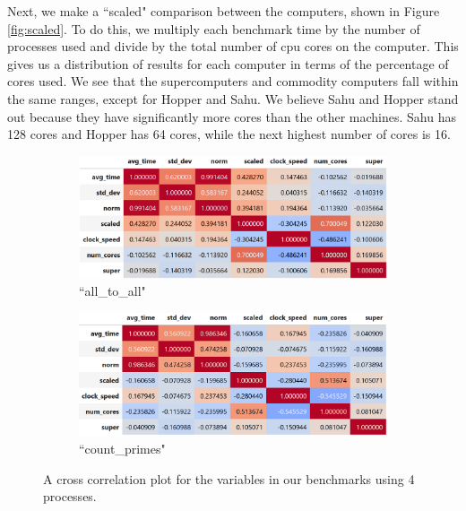 \documentclass{article}
\begin{document}
Next, we make a ``scaled" comparison between the computers, shown in Figure \ref{fig:scaled}. To do this, we multiply each benchmark time by the number of processes used and divide by the total number of cpu cores on the computer. This gives us a distribution of results for each computer in terms of the percentage of cores used. We see that the supercomputers and commodity computers fall within the same ranges, except for Hopper and Sahu. We believe Sahu and Hopper stand out because they have significantly more cores than the other machines. Sahu has 128 cores and Hopper has 64 cores, while the next highest number of cores is 16.


\begin{figure}[h]
    \centering
    \begin{subfigure}[b]{0.49\textwidth}
         \centering
         \includegraphics[width=\textwidth]{figures/final/xcorr_all_to_all.png}
         \caption{``all\_to\_all"}
         \label{fig:all_to_all}
     \end{subfigure}
     \hfill
     \begin{subfigure}[b]{0.49\textwidth}
         \centering
         \includegraphics[width=\textwidth]{figures/final/xcorr_count_primes.png}
         \caption{``count\_primes"}
         \label{fig:normalized}
     \end{subfigure}
     \hfill
    \caption{ A cross correlation plot for the variables in our benchmarks using 4 processes. }
    \label{fig:xcorrelation}
\end{figure}
\end{document}
